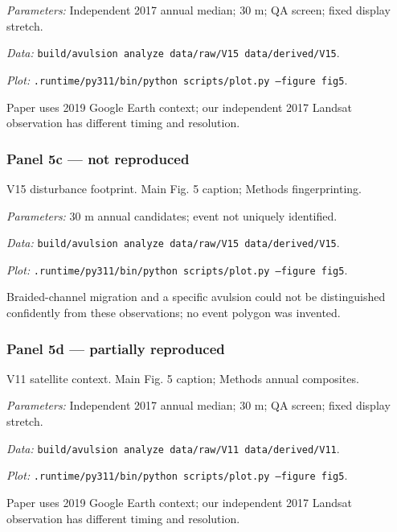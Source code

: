 \textit{Parameters:} Independent 2017 annual median; 30 m; QA screen; fixed display stretch.

\textit{Data:} \texttt{build/\allowbreak{}avulsion analyze data/\allowbreak{}raw/\allowbreak{}V15 data/\allowbreak{}derived/\allowbreak{}V15}.

\textit{Plot:} \texttt{.runtime/\allowbreak{}py311/\allowbreak{}bin/\allowbreak{}python scripts/\allowbreak{}plot.py --figure fig5}.

Paper uses 2019 Google Earth context; our independent 2017 Landsat observation has different timing and resolution.

\subsubsection*{Panel 5c --- not reproduced}
V15 disturbance footprint. Main Fig. 5 caption; Methods fingerprinting.

\textit{Parameters:} 30 m annual candidates; event not uniquely identified.

\textit{Data:} \texttt{build/\allowbreak{}avulsion analyze data/\allowbreak{}raw/\allowbreak{}V15 data/\allowbreak{}derived/\allowbreak{}V15}.

\textit{Plot:} \texttt{.runtime/\allowbreak{}py311/\allowbreak{}bin/\allowbreak{}python scripts/\allowbreak{}plot.py --figure fig5}.

Braided-channel migration and a specific avulsion could not be distinguished confidently from these observations; no event polygon was invented.

\subsubsection*{Panel 5d --- partially reproduced}
V11 satellite context. Main Fig. 5 caption; Methods annual composites.

\textit{Parameters:} Independent 2017 annual median; 30 m; QA screen; fixed display stretch.

\textit{Data:} \texttt{build/\allowbreak{}avulsion analyze data/\allowbreak{}raw/\allowbreak{}V11 data/\allowbreak{}derived/\allowbreak{}V11}.

\textit{Plot:} \texttt{.runtime/\allowbreak{}py311/\allowbreak{}bin/\allowbreak{}python scripts/\allowbreak{}plot.py --figure fig5}.

Paper uses 2019 Google Earth context; our independent 2017 Landsat observation has different timing and resolution.

